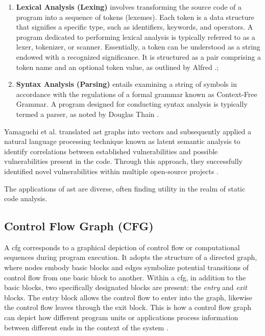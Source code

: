 \begin{enumerate}
\item \textbf{Lexical Analysis (Lexing)} involves transforming the source code of a program into a sequence of tokens (lexemes). Each token is a data structure that signifies a specific type, such as identifiers, keywords, and operators. A program dedicated to performing lexical analysis is typically referred to as a lexer, tokenizer, or scanner. Essentially, a token can be understood as a string endowed with a recognized significance. It is structured as a pair comprising a token name and an optional token value, as outlined by Alfred \cite{Alfred_V2007}.;
\item \textbf{Syntax Analysis (Parsing)} entails examining a string of symbols in accordance with the regulations of a formal grammar known as Context-Free Grammar. A program designed for conducting syntax analysis is typically termed a parser, as noted by Douglas Thain \cite{Douglas_Thain}. 
\end{enumerate}

Yamaguchi et al. \cite{Fabian_Markus_Konrad2023} translated \gls{ast} graphs into vectors and subsequently applied a natural language processing technique known as latent semantic analysis to identify correlations between established vulnerabilities and possible vulnerabilities present in the code. Through this approach, they successfully identified novel vulnerabilities within multiple open-source projects \cite{Fabian_Markus_Konrad2023}.

The applications of \gls{ast} are diverse, often finding utility in the realm of static code analysis.


\subsection{Control Flow Graph (CFG)} %
\label{sec: Control_Flow_Graph}

A \gls{cfg} corresponds to a graphical depiction of control flow or computational sequences during program execution. It adopts the structure of a directed graph, where nodes embody basic blocks and edges symbolize potential transitions of control flow from one basic block to another. Within a \gls{cfg}, in addition to the basic blocks, two specifically designated blocks are present: the \textit{entry} and \textit{exit} blocks. The entry block allows the control flow to enter into the graph, likewise the control flow leaves through the exit block. This is how a control flow graph can depict how different program units or applications process information between different ends in the context of the system \cite{Kronjee2018}.

